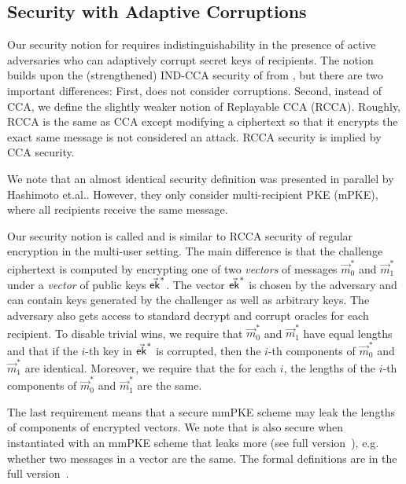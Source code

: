 \subsection{Security with Adaptive Corruptions}
Our security notion for \mmPKE requires indistinguishability in the presence of active adversaries who can adaptively corrupt secret keys of recipients. The notion builds upon the (strengthened) IND-CCA security of \mmPKE from \cite{ASIACCS:PinPoeSch14}, but there are two important differences: First, \cite{ASIACCS:PinPoeSch14} does not consider corruptions. Second, instead of CCA, we define the slightly weaker notion of Replayable CCA (RCCA). Roughly, RCCA \cite{C:CanKraNie03} is the same as CCA except modifying a ciphertext so that it encrypts the exact same message is not considered an attack. RCCA security is implied by CCA security.

We note that an almost identical security definition was presented in parallel by Hashimoto
et.al.\cite{hashimoto2021cmpke}. However, they only consider multi-recipient PKE (mPKE), where all
recipients receive the same message.

Our security notion is called \mmindrcca and is similar to
RCCA security of regular encryption in the multi-user setting. The main difference is that the challenge ciphertext is computed by encrypting one of two \emph{vectors} of messages $\vec m_0^*$ and $\vec m_1^*$ under a \emph{vector} of public keys $\vec{{\mathsf{ek}}}^*$.
The vector $\vec{{\mathsf{ek}}}^*$ is chosen by the adversary and can contain keys generated by the challenger as well as
arbitrary keys. The adversary also gets access to standard decrypt and corrupt oracles for each recipient.
%
To disable trivial wins, we require that  $\vec m_0^*$ and $\vec m_1^*$ have equal lengths and that if the $i$-th key in $\vec{{\mathsf{ek}}}^*$ is corrupted, then the $i$-th components of $\vec m_0^*$ and $\vec m_1^*$ are identical. Moreover, we require that the for each $i$, the lengths of the $i$-th components of  $\vec m_0^*$ and $\vec m_1^*$ are the same.

The last requirement means that a secure mmPKE scheme may leak the lengths of components of encrypted vectors. We note
that \saik is also secure when instantiated with an mmPKE scheme that leaks more (see full version~\cite{EPRINT:AHKM21}), e.g. whether two messages in a vector are the same.
%
%
%
The formal definitions are in the full version~\cite{EPRINT:AHKM21}.


